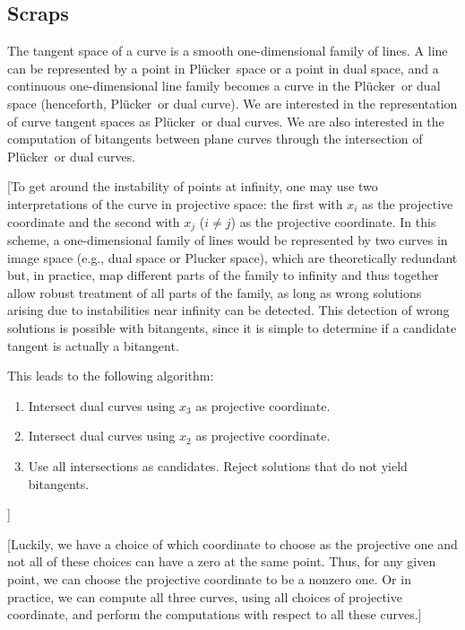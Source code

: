 \documentclass[12pt]{article}
\newcommand{\plucker}{Pl\"{u}cker\ }
\begin{document}
\subsection{Scraps}

The tangent space of a curve is a smooth one-dimensional family of lines.
A line can be represented by a point in \plucker space or a point in dual space,
and a continuous one-dimensional line family becomes a curve 
in the \plucker or dual space (henceforth, \plucker or dual curve).
We are interested in the representation of curve tangent spaces as
\plucker or dual curves.
We are also interested in the computation of bitangents between
plane curves through the intersection of \plucker or dual curves.


[To get around the instability of points at infinity,
one may use two interpretations of the curve in projective space:
the first with $x_i$ as the projective coordinate and the second
with $x_j$ ($i \neq j$) as the projective coordinate.
In this scheme, a one-dimensional family of lines would be represented
by two curves in image space (e.g., dual space or Plucker space),
which are theoretically redundant but, in practice, map different parts
of the family to infinity and thus together allow robust treatment of all parts
of the family, as long as wrong solutions arising due to instabilities
near infinity can be detected.
This detection of wrong solutions is possible with bitangents, 
since it is simple to determine
if a candidate tangent is actually a bitangent.

This leads to the following algorithm:
\begin{enumerate}
\item Intersect dual curves using $x_3$ as projective coordinate.
\item Intersect dual curves using $x_2$ as projective coordinate.
\item Use all intersections as candidates.  Reject solutions that
	do not yield bitangents.
\end{enumerate}
]

[Luckily, we have a choice of which coordinate to choose as the projective one
and not all of these choices can have a zero at the same point.
Thus, for any given point, we can choose the projective coordinate to be
a nonzero one.
Or in practice, we can compute all three curves, using all choices of projective
coordinate, and perform the computations with respect to all these curves.]
\end{document}
